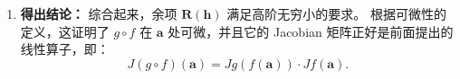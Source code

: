 \documentclass[lang=cn,11pt]{elegantbook}
\begin{document}
\begin{solution}
\begin{enumerate}
  对于第二项，我们将其变形为：
  \[
  \frac{\|\boldsymbol r_2(\boldsymbol k)\|}{\|\boldsymbol h\|} = \begin{cases}
  \dfrac{\|\boldsymbol r_2(\boldsymbol k)\|}{\|\boldsymbol k\|} \cdot \dfrac{\|\boldsymbol k\|}{\|\boldsymbol h\|}, & \boldsymbol k \neq \boldsymbol 0 \\
  0, & \boldsymbol k = \boldsymbol 0
  \end{cases}
  \]
  由于 $\boldsymbol k = Jf(\boldsymbol a)\boldsymbol h + \boldsymbol r_1(\boldsymbol h)$，有：
  \[
  \frac{\|\boldsymbol k\|}{\|\boldsymbol h\|} \leqslant  \|Jf(\boldsymbol a)\| + \frac{\|\boldsymbol r_1(\boldsymbol h)\|}{\|\boldsymbol h\|}
  \]
  当 $\boldsymbol h \to \boldsymbol 0$ 时，该式趋于 $\|Jf(\boldsymbol a)\| + 0$，因而是有界的。
  又因为当 $\boldsymbol h \to \boldsymbol 0$ 时 $\boldsymbol k \to \boldsymbol 0$，所以 $\frac{\|\boldsymbol r_2(\boldsymbol k)\|}{\|\boldsymbol k\|} \to 0$。
  有界量乘以无穷小量依然为无穷小量。故第二项也趋于 0。
  
  \item \textbf{得出结论：}
  综合起来，余项 $\boldsymbol R(\boldsymbol h)$ 满足高阶无穷小的要求。
  根据可微性的定义，这证明了 $g \circ f$ 在 $\boldsymbol a$ 处可微，并且它的 Jacobian 矩阵正好是前面提出的线性算子，即：
  \[
  J(g \circ f)(\boldsymbol a) = Jg(f(\boldsymbol a)) \cdot Jf(\boldsymbol a).
  \]
\end{enumerate}
\end{solution}
\end{document}
